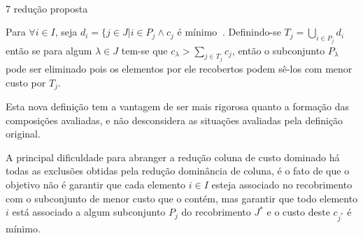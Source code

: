 \documentclass[a4paper,10pt]{article}
\begin{document}
\paragraph{}
7 redução proposta

Para $ \forall i \in I$, seja $ d_{i} = \{j \in J | i \in P_{j} \wedge c_{j}$ é mínimo $ \ $. Definindo-se $T_{j}= \bigcup _{ i \in P_{j} } d_{i} $ então se para algum $ \lambda \in J$ tem-se que $c_{ \lambda} > \sum _{ j \in T_{j} } c_{j} $, então o subconjunto $ P_{ \lambda }$ pode ser eliminado pois os elementos por ele recobertos podem sê-los com menor custo por $T_{j}$.

Esta nova definição tem a vantagem de ser mais rigorosa quanto a formação das composições avaliadas, e não desconsidera as situações avaliadas pela definição original.

A principal dificuldade para abranger a redução coluna de custo dominado há todas as exclusões obtidas pela redução dominância de coluna, é o fato de que o objetivo não é garantir que cada elemento $i \in I$ esteja associado no recobrimento com o subconjunto de menor custo que o contém, mas garantir que todo elemento $i$ está associado a algum subconjunto $P_{j}$ do recobrimento $J^{*}$ e o custo deste $c_{j^{*} } $ é mínimo.
\end{document}
